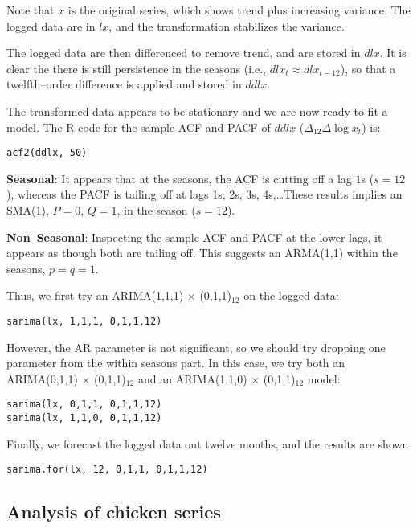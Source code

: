 \documentclass[
paper=128mm:96mm, %
fontsize=9.5pt, %
pagesize, %
parskip=half-, %
]{scrartcl} %
\theoremstyle{mythmstyle} %
\begin{document}
Note that $x$ is the original series, which shows trend plus increasing variance. The logged data are in $lx$, and the transformation stabilizes the variance. 

The logged data are then differenced to remove trend, and are stored in $dlx$. It is clear the there is still persistence in the seasons (i.e., $dlx_t\approx dlx_{t-12}$), so that a twelfth--order difference is applied and stored in $ddlx$. 

The transformed data appears to be stationary and we are now ready to fit a model. The R code for the sample ACF and PACF of $ddlx$ ($\Delta_{12}\Delta\log x_t$) is:
%
\begin{lstlisting}[belowskip=-0.8 \baselineskip]
acf2(ddlx, 50)
\end{lstlisting}
\clearpage

\textbf{Seasonal}: It appears that at the seasons, the ACF is cutting off a lag $1$s
($s = 12$), whereas the PACF is tailing off at lags 1s, 2s, 3s, 4s,\ldots These results implies an SMA(1), $P = 0$, $Q = 1$, in the season ($s = 12$). 

\textbf{Non--Seasonal}: Inspecting the sample ACF and PACF at the lower lags, it appears as though both are tailing off. This suggests an ARMA(1,1) within the seasons, $p = q = 1$.

Thus, we first try an ARIMA(1,1,1) $\times$ (0,1,1)$_{12}$ on the logged data:
%
\begin{lstlisting}[belowskip=-0.8 \baselineskip]
sarima(lx, 1,1,1, 0,1,1,12)
\end{lstlisting}
%
\clearpage


However, the AR parameter is not significant, so we should try dropping one parameter from the within seasons part. In this case, we try both an ARIMA(0,1,1) $\times$ (0,1,1)$_{12}$ and an ARIMA(1,1,0) $\times$ (0,1,1)$_{12}$ model:
%
\begin{lstlisting}[belowskip=-0.8 \baselineskip]
sarima(lx, 0,1,1, 0,1,1,12)
sarima(lx, 1,1,0, 0,1,1,12)
\end{lstlisting}

Finally, we forecast the logged data out twelve months, and the results are shown
%
\begin{lstlisting}[belowskip=-0.8 \baselineskip]
sarima.for(lx, 12, 0,1,1, 0,1,1,12)
\end{lstlisting}
\clearpage

\subsection{Analysis of chicken series}
\end{document}
